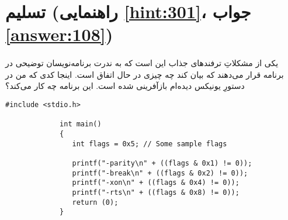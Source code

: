 \section[تسلیم]{تسلیم \protect{} (راهنمایی \ref{hint:301}، جواب \ref{answer:108})}
\paragraph{}\label{prog:105}
یکی از مشکلاتِ ترفندهای جذاب این است که به ندرت برنامه‌نویسان توضیحی در برنامه قرار می‌دهند که بیان کند چه چیزی در حال اتفاق است. اینجا کدی که من در دستورِ  یونیکس دیده‌ام بازآفرینی شده است. این برنامه چه کار می‌کند؟

\begin{LTR}
        \begin{lstlisting}[style=C++Style]
             #include <stdio.h>

             int main()
             {
             	int flags = 0x5; // Some sample flags

             	printf("-parity\n" + ((flags & 0x1) != 0));
             	printf("-break\n" + ((flags & 0x2) != 0));
             	printf("-xon\n" + ((flags & 0x4) != 0));
             	printf("-rts\n" + ((flags & 0x8) != 0));
             	return (0);
             }
        \end{lstlisting}
\end{LTR}
